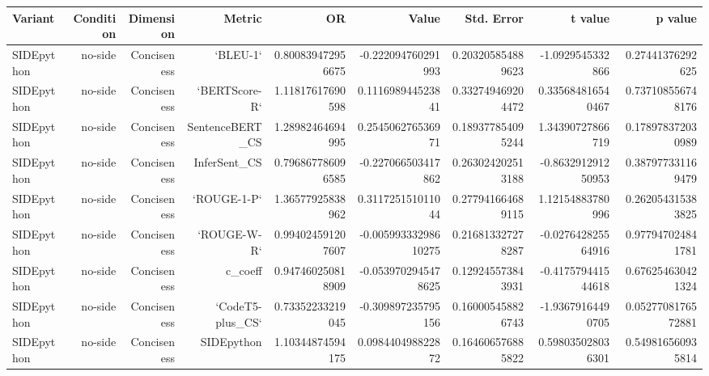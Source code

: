 \begin{tabular}{lrrrrrrrr}
\hline
Variant & Condition & Dimension & Metric & OR & Value & Std. Error & t value & p value
\\
\hline
SIDEpython & no-side & Conciseness & `BLEU-1` & 0.800839472956675 & -0.222094760291993 & 0.203205854889623 & -1.0929545332866 & 0.27441376292625
\\
SIDEpython & no-side & Conciseness & `BERTScore-R` & 1.11817617690598 & 0.111698944523841 & 0.332749469204472 & 0.335684816540467 & 0.737108556748176
\\
SIDEpython & no-side & Conciseness & SentenceBERT\_CS & 1.28982464694995 & 0.254506276536971 & 0.189377854095244 & 1.34390727866719 & 0.178978372030989
\\
SIDEpython & no-side & Conciseness & InferSent\_CS & 0.796867786096585 & -0.227066503417862 & 0.263024202513188 & -0.863291291250953 & 0.387977331169479
\\
SIDEpython & no-side & Conciseness & `ROUGE-1-P` & 1.36577925838962 & 0.311725151011044 & 0.277941664689115 & 1.12154883780996 & 0.262054315383825
\\
SIDEpython & no-side & Conciseness & `ROUGE-W-R` & 0.994024591207607 & -0.00599333298610275 & 0.216813327278287 & -0.027642825564916 & 0.977947024841781
\\
SIDEpython & no-side & Conciseness & c\_coeff & 0.947460250818909 & -0.0539702945478625 & 0.129245573843931 & -0.417579441544618 & 0.676254630421324
\\
SIDEpython & no-side & Conciseness & `CodeT5-plus\_CS` & 0.73352233219045 & -0.309897235795156 & 0.160005458826743 & -1.93679164490705 & 0.0527708176572881
\\
SIDEpython & no-side & Conciseness & SIDEpython & 1.10344874594175 & 0.098440498822872 & 0.164606576885822 & 0.598035028036301 & 0.549816560935814
\\
\hline
\end{tabular}
